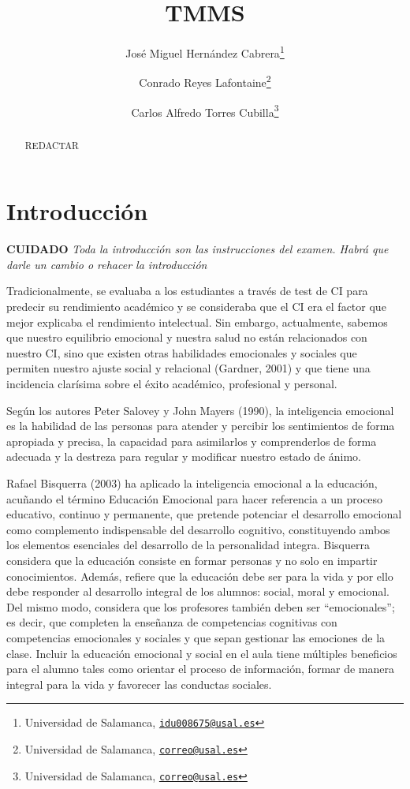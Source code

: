 \documentclass[
  10pt,
  spanish,
]{article}
\title{TMMS}
\author{José Miguel Hernández Cabrera\footnote{Universidad de Salamanca,
  \href{mailto:idu008675@usal.es}{\nolinkurl{idu008675@usal.es}}} \and Conrado Reyes Lafontaine\footnote{Universidad de Salamanca,
  \href{mailto:correo@usal.es}{\nolinkurl{correo@usal.es}}} \and Carlos Alfredo Torres Cubilla\footnote{Universidad de Salamanca,
  \href{mailto:correo@usal.es}{\nolinkurl{correo@usal.es}}}}
\date{}
\begin{document}
\maketitle
\begin{abstract}
REDACTAR
\end{abstract}

\hypertarget{introducciuxf3n}{%
\section{Introducción}\label{introducciuxf3n}}

\textbf{CUIDADO} \emph{Toda la introducción son las instrucciones del
examen. Habrá que darle un cambio o rehacer la introducción}

Tradicionalmente, se evaluaba a los estudiantes a través de test de CI
para predecir su rendimiento académico y se consideraba que el CI era el
factor que mejor explicaba el rendimiento intelectual. Sin embargo,
actualmente, sabemos que nuestro equilibrio emocional y nuestra salud no
están relacionados con nuestro CI, sino que existen otras habilidades
emocionales y sociales que permiten nuestro ajuste social y relacional
(Gardner, 2001) y que tiene una incidencia clarísima sobre el éxito
académico, profesional y personal.

Según los autores Peter Salovey y John Mayers (1990), la inteligencia
emocional es la habilidad de las personas para atender y percibir los
sentimientos de forma apropiada y precisa, la capacidad para asimilarlos
y comprenderlos de forma adecuada y la destreza para regular y modificar
nuestro estado de ánimo.

Rafael Bisquerra (2003) ha aplicado la inteligencia emocional a la
educación, acuñando el término Educación Emocional para hacer referencia
a un proceso educativo, continuo y permanente, que pretende potenciar el
desarrollo emocional como complemento indispensable del desarrollo
cognitivo, constituyendo ambos los elementos esenciales del desarrollo
de la personalidad integra. Bisquerra considera que la educación
consiste en formar personas y no solo en impartir conocimientos. Además,
refiere que la educación debe ser para la vida y por ello debe responder
al desarrollo integral de los alumnos: social, moral y emocional. Del
mismo modo, considera que los profesores también deben ser
``emocionales''; es decir, que completen la enseñanza de competencias
cognitivas con competencias emocionales y sociales y que sepan gestionar
las emociones de la clase. Incluir la educación emocional y social en el
aula tiene múltiples beneficios para el alumno tales como orientar el
proceso de información, formar de manera integral para la vida y
favorecer las conductas sociales.
\end{document}
